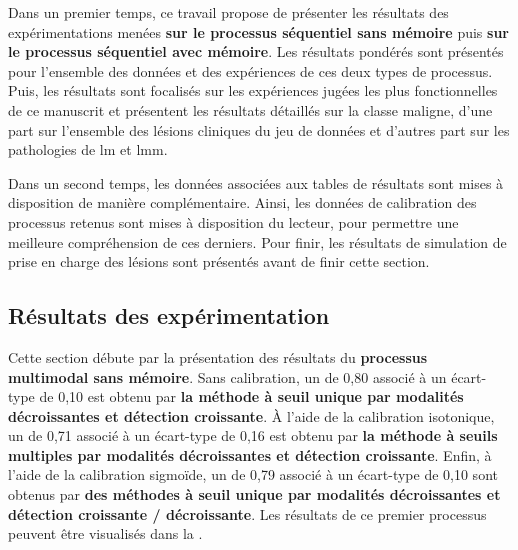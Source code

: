 Dans un premier temps, ce travail propose de présenter les résultats des expérimentations menées \textbf{sur le processus séquentiel sans mémoire} puis \textbf{sur le processus séquentiel avec mémoire}. Les résultats pondérés sont présentés pour l'ensemble des données et des expériences de ces deux types de processus. Puis, les résultats sont focalisés sur les expériences jugées les plus fonctionnelles de ce manuscrit et présentent les résultats détaillés sur la classe maligne, d'une part sur l'ensemble des lésions cliniques du jeu de données et d'autres part sur les pathologies de \gls{lm} et \gls{lmm}.\par

Dans un second temps, les données associées aux tables de résultats sont mises à disposition de manière complémentaire. Ainsi, les données de calibration des processus retenus sont mises à disposition du lecteur, pour permettre une meilleure compréhension de ces derniers. Pour finir, les résultats de simulation de prise en charge des lésions sont présentés avant de finir cette section.\par
\clearpage

\subsection{Résultats des expérimentation}
Cette section débute par la présentation des résultats du \textbf{processus multimodal sans mémoire}. Sans calibration, un \fscore{} de 0,80 associé à un écart-type de 0,10 est obtenu par \textbf{la méthode à seuil unique par modalités décroissantes et détection croissante}. À l'aide de la calibration isotonique, un \fscore{} de 0,71 associé à un écart-type de 0,16 est obtenu par \textbf{la méthode à seuils multiples par modalités décroissantes et détection croissante}. Enfin, à l'aide de la calibration sigmoïde, un \fscore{} de 0,79 associé à un écart-type de 0,10 sont obtenus par \textbf{des méthodes à seuil unique par modalités décroissantes et détection croissante / décroissante}. Les résultats de ce premier processus peuvent être visualisés dans la .\par

